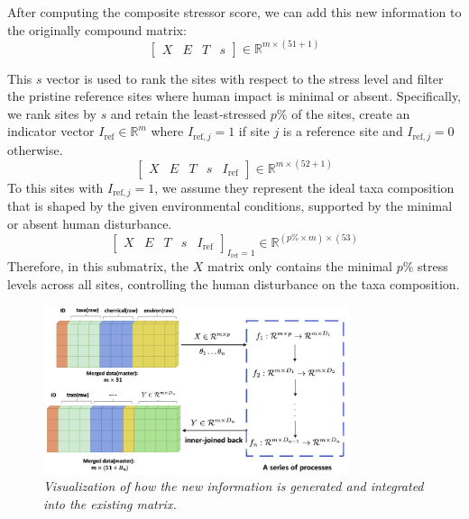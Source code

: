 After computing the composite stressor score, we can add this new information to the originally compound matrix:
\[
\left[
\begin{array}{cccc}
X & E & T & s
\end{array}
\right] 
\in
\mathbb{R}^{m \times (51 + 1)}
\]

This \(s\) vector is used to rank the sites with respect to 
the stress level and filter the pristine reference sites where
human impact is minimal or absent. 
Specifically, we rank sites by \(s\) and retain the least‑stressed \(p\%\) of the sites,
create an indicator vector \(I_{\text{ref}} \in \mathbb{R}^{m}\) where \(I_{\text{ref},j} = 1\) if site \(j\) is a reference site and \(I_{\text{ref},j} = 0\) otherwise.
\[
\left[
\begin{array}{ccccc}
X & E & T & s & I_{\text{ref}}
\end{array}
\right] 
\in
\mathbb{R}^{m \times (52 + 1)}
\]
To this sites with \(I_{\text{ref},j} = 1\), we assume they represent
the ideal taxa composition that is shaped by the given environmental conditions,
supported by the minimal or absent human disturbance.
\[
\left[
\begin{array}{ccccc}
X & E & T & s & I_{\text{ref}} 
\end{array}
\right]_{I_{\text{ref}} = 1}
\in
\mathbb{R}^{(p\% \times m) \times (53)}
\]
Therefore, in this submatrix, the \(X\) matrix only contains the minimal \(p\%\) stress levels across all sites,
controlling the human disturbance on the taxa composition.

\begin{figure}[!h]
\centering
\includegraphics[width=0.8\textwidth]{../results/ideas_visualization/operate_data_throughout2.png}
\caption{\textit{Visualization of how the new information is generated and integrated into the existing matrix.}}
\label{fig:p4_rules_for_data_operation}
\end{figure}

